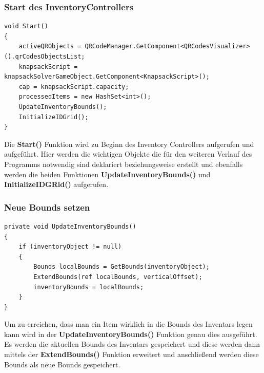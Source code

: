 \subsubsection{Start des InventoryControllers}
\begin{lstlisting}[style=csharp, caption={Start Funktion des InventoryControllers}, label=code:controller_start]
void Start()
{
    activeQRObjects = QRCodeManager.GetComponent<QRCodesVisualizer>().qrCodesObjectsList;
    knapsackScript = knapsackSolverGameObject.GetComponent<KnapsackScript>();
    cap = knapsackScript.capacity;
    processedItems = new HashSet<int>();
    UpdateInventoryBounds();
    InitializeIDGrid();
}
\end{lstlisting}
Die \textbf{Start()} Funktion wird zu Beginn des Inventory Controllers aufgerufen und aufgeführt. Hier werden die
wichtigen Objekte die für den weiteren Verlauf des Programms notwendig sind deklariert beziehungsweise erstellt und
ebenfalls werden die beiden Funktionen \textbf{UpdateInventoryBounds()} und \textbf{InitializeIDGRid()} aufgerufen.\\

\subsubsection{Neue Bounds setzen}
\begin{lstlisting}[style=csharp, caption={Funktion um Inventar Bounds zu erweitern}, label=code:controller_updateBounds]
private void UpdateInventoryBounds()
{
    if (inventoryObject != null)
    {
        Bounds localBounds = GetBounds(inventoryObject);
        ExtendBounds(ref localBounds, verticalOffset);
        inventoryBounds = localBounds;
    }
}
\end{lstlisting}
Um zu erreichen, dass man ein Item wirklich in die Bounds des Inventars legen kann wird in der \textbf{UpdateInventoryBounds()}
Funktion genau dies ausgeführt. Es werden die aktuellen Bounds des Inventars gespeichert und diese werden dann mittels
der \textbf{ExtendBounds()} Funktion erweitert und anschließend werden diese Bounds als neue Bounds gespeichert.\\

